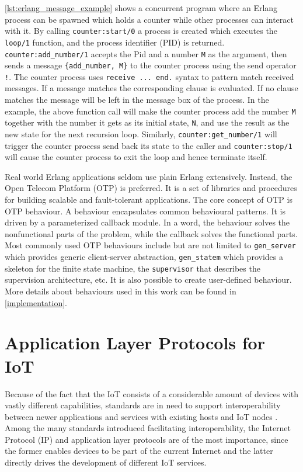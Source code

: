 \autoref{lst:erlang_message_example} shows a concurrent program where an Erlang process can be spawned which holds a counter while other processes can interact with it. By calling \verb|counter:start/0| a process is created which executes the \verb|loop/1| function, and the process identifier (PID) is returned. \verb|counter:add_number/1| accepts the Pid and a number \verb|M| as the argument, then sends a message \verb|{add_number, M}| to the counter process using the send operator \verb|!|. The counter process uses \verb|receive ... end.| syntax to pattern match received messages. If a message matches the corresponding clause is evaluated. If no clause matches the message will be left in the message box of the process. In the example, the above function call will make the counter process add the number \verb|M| together with the number it gets as its initial state, \verb|N|, and use the result as the new state for the next recursion loop. Similarly, \verb|counter:get_number/1| will trigger the counter process send back its state to the caller and \verb|counter:stop/1| will cause the counter process to exit the loop and hence terminate itself.

Real world Erlang applications seldom use plain Erlang extensively. Instead, the Open Telecom Platform (OTP) is preferred. It is a set of libraries and procedures for building scalable and fault-tolerant applications. The core concept of OTP is OTP behaviour. A behaviour encapsulates common behavioural patterns. It is driven by a parameterized callback module. In a word, the behaviour solves the nonfunctional parts of the problem, while the callback solves the functional parts. Most commonly used OTP behaviours include but are not limited to \verb|gen_server| which provides generic client-server abstraction, \verb|gen_statem| which provides a skeleton for the finite state machine, the \verb|supervisor| that describes the supervision architecture, etc. It is also possible to create user-defined behaviour. More details about behaviours used in this work can be found in \autoref{implementation}.

\section{Application Layer Protocols for IoT} \label{IoT_protocols}

Because of the fact that the IoT consists of a considerable amount of devices with vastly different capabilities, standards are in need to support interoperability between newer applications and services with existing hosts and IoT nodes \cite{cirani2015mjcoap}.  Among the many standards introduced facilitating interoperability, the Internet Protocol (IP) and application layer protocols are of the most importance, since the former enables devices to be part of the current Internet and the latter directly drives the development of different IoT services.

